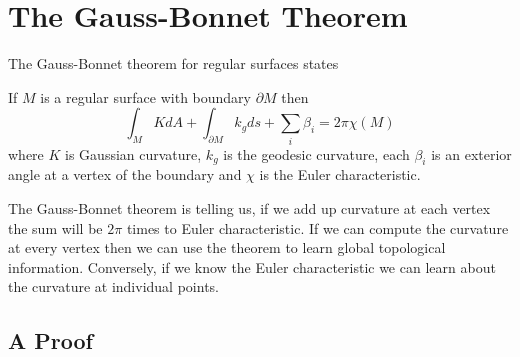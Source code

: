 \section{The Gauss-Bonnet Theorem}



The Gauss-Bonnet theorem for regular surfaces states

\begin{theorem} \label{thm:g-b-c}

If $M$ is a regular surface with boundary $\partial M$ then
	$$\int_{M} K dA+ \int_{\partial M} k_g ds + \sum_i \beta_i= 2\pi \chi(M)$$
	where  $K$ is Gaussian curvature,
	 $k_g$ is the geodesic curvature,
	 each $\beta_i$  is an exterior angle at a vertex of the boundary and
	$\chi$ is the Euler characteristic.
\end{theorem}


The  Gauss-Bonnet theorem is  telling us, if we add up curvature
at each vertex the sum will be $2\pi$ times to Euler characteristic.
If we can compute the curvature at every vertex then we can use the theorem
to learn global topological information.
Conversely, if we know the Euler characteristic we can learn about the curvature
at individual points.

\subsection{A Proof}

